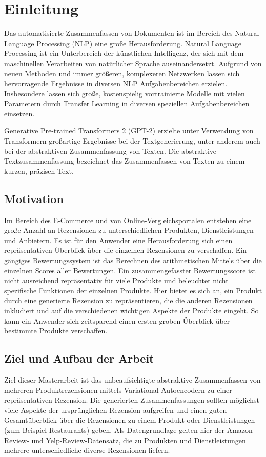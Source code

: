 \section{Einleitung}\raggedbottom
Das automatisierte Zusammenfassen von Dokumenten ist im Bereich des Natural Language Processing (NLP) eine große Herausforderung.
Natural Language Processing ist ein Unterbereich der künstlichen Intelligenz, der sich mit dem maschinellen Verarbeiten von natürlicher Sprache auseinandersetzt. 
Aufgrund von neuen Methoden und immer größeren, komplexeren Netzwerken lassen sich hervorragende Ergebnisse in diversen NLP Aufgabenbereichen erzielen. 
Insbesondere lassen sich große, kostenspielig vortrainierte Modelle mit vielen Parametern durch Transfer Learning in diversen speziellen Aufgabenbereichen einsetzen. 

Generative Pre-trained Transformers 2 (GPT-2) erzielte unter Verwendung von Transformern großartige Ergebnisse bei der Textgenerierung, unter anderem auch bei der abstraktiven Zusammenfassung von Texten. 
Die abstraktive Textzusammenfassung bezeichnet das Zusammenfassen von Texten zu einem kurzen, präzisen Text. 

\subsection{Motivation}
Im Bereich des E-Commerce und von Online-Vergleichsportalen entstehen eine große Anzahl an Rezensionen zu unterschiedlichen Produkten, Dienstleistungen und Anbietern.
Es ist für den Anwender eine Herausforderung sich einen repräsentativen Überblick über die einzelnen Rezensionen zu verschaffen. 
Ein gängiges Bewertungssystem ist das Berechnen des arithmetischen Mittels über die einzelnen Scores aller Bewertungen. 
Ein zusammengefasster Bewertungsscore ist nicht ausreichend repräsentativ für viele Produkte und beleuchtet nicht spezifische Funktionen der einzelnen Produkte.
Hier bietet es sich an, ein Produkt durch eine generierte Rezension zu repräsentieren, die die anderen Rezensionen inkludiert und auf die verschiedenen wichtigen Aspekte der Produkte eingeht.
So kann ein Anwender sich zeitsparend einen ersten groben Überblick über bestimmte Produkte verschaffen.

\subsection{Ziel und Aufbau der Arbeit}
Ziel dieser Masterarbeit ist das unbeaufsichtigte abstraktive Zusammenfassen von mehreren Produktrezensionen mittels Variational Autoencodern zu einer repräsentativen Rezension.
Die generierten Zusammenfassungen sollten möglichst viele Aspekte der ursprünglichen Rezension aufgreifen und einen guten Gesamtüberblick über die Rezensionen zu einem Produkt oder Dienstleistungen (zum Beispiel Restaurants) geben.
Als Datengrundlage gelten hier der Amazon-Review- und Yelp-Review-Datensatz, die zu Produkten und Dienstleistungen mehrere unterschiedliche diverse Rezensionen liefern.

